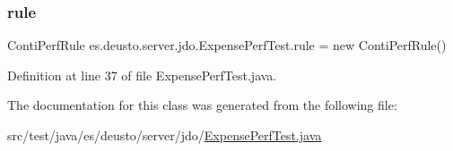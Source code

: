 \subsubsection{\texorpdfstring{rule}{rule}}
{\footnotesize\ttfamily Conti\+Perf\+Rule es.\+deusto.\+server.\+jdo.\+Expense\+Perf\+Test.\+rule = new Conti\+Perf\+Rule()}



Definition at line 37 of file Expense\+Perf\+Test.\+java.



The documentation for this class was generated from the following file\+:\begin{DoxyCompactItemize}
\item 
src/test/java/es/deusto/server/jdo/\hyperlink{_expense_perf_test_8java}{Expense\+Perf\+Test.\+java}\end{DoxyCompactItemize}
